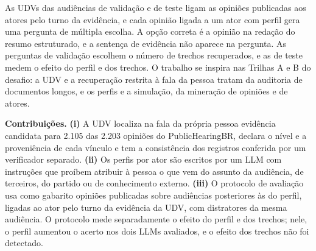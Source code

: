 As UDVs das audiências de validação e de teste ligam as opiniões publicadas aos atores pelo turno da
evidência, e cada opinião ligada a um ator com perfil gera uma pergunta de múltipla escolha. A opção
correta é a opinião na redação do resumo estruturado, e a sentença de evidência não aparece na
pergunta. As perguntas de validação escolhem o número de trechos recuperados, e as de teste medem o
efeito do perfil e dos trechos. O trabalho se inspira nas Trilhas A e B do desafio: a UDV e a
recuperação restrita à fala da pessoa tratam da auditoria de documentos longos, e os perfis e a
simulação, da mineração de opiniões e de atores.

\medskip\noindent\textbf{Contribui\c{c}\~oes.} \textbf{(i)} A UDV localiza na fala da própria pessoa
evidência candidata para 2.105 das 2.203 opiniões do PublicHearingBR, declara o nível e a
proveniência de cada vínculo e tem a consistência dos registros conferida por um verificador
separado. \textbf{(ii)} Os perfis por ator são escritos por um LLM com instruções que proíbem
atribuir à pessoa o que vem do assunto da audiência, de terceiros, do partido ou de conhecimento
externo. \textbf{(iii)} O protocolo de avaliação usa como gabarito opiniões publicadas sobre
audiências posteriores às do perfil, ligadas ao ator pelo turno da evidência da UDV, com distratores
da mesma audiência. O protocolo mede separadamente o efeito do perfil e dos trechos; nele,
o perfil aumentou o acerto nos dois LLMs avaliados, e o efeito dos trechos não foi detectado.
